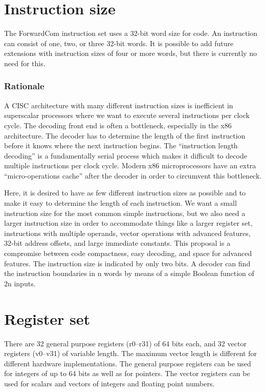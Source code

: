 \documentclass[forwardcom.tex]{subfiles}
\begin{document}
\section{Instruction size}
The ForwardCom instruction set uses a 32-bit word size for code. 
An instruction can consist of one, two, or three 32-bit words. 
It is possible to add future extensions with instruction sizes of four or more words, but there is currently no need for this.

\subsubsection{Rationale}
A CISC architecture with many different instruction sizes is inefficient in superscalar processors where we want to execute several instructions per clock cycle. The decoding front end is often a bottleneck, especially in the x86 architecture. The decoder has to determine the length of the first instruction before it knows where the next instruction begins. The ``instruction length decoding'' is a fundamentally serial process which makes it difficult to decode multiple instructions per clock cycle. Modern x86 microprocessors have an extra ``micro-operations cache'' after the decoder in order to circumvent this bottleneck.
\vv

Here, it is desired to have as few different instruction sizes as possible and to make it easy to determine the length of each instruction. We want a small instruction size for the most common simple instructions, but we also need a larger instruction size in order to accommodate things like a larger register set, instructions with multiple operands, vector operations with advanced features, 32-bit address offsets, and large immediate constants. This proposal is a compromise between code compactness, easy decoding, and space for advanced features.
The instruction size is indicated by only two bits. A decoder can find the instruction boundaries in n words by means of a simple Boolean function of 2n inputs.

\section{Register set}
There are 32 general purpose registers (r0--r31) of 64 bits each, and 32 vector registers (v0--v31) of variable length. The maximum vector length is different for different hardware implementations. The general purpose registers can be used for integers of up to 64 bits as well as for pointers. The vector registers can be used for scalars and vectors of integers and floating point numbers. 
\vv
\end{document}
